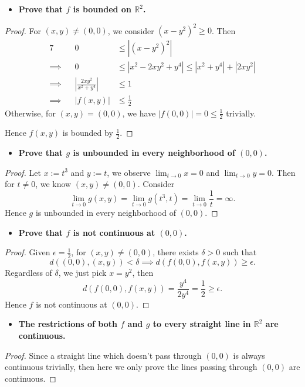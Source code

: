 \begin{Exercise}
	\begin{itemize}
		\item \textbf{Prove that $f$ is bounded on $\mathbb{R}^2$.}
	\end{itemize}
	\begin{proof}
		For $(x,y) \neq (0,0)$, we consider $(x-y^2)^2 \geq 0$. Then
		\begin{alignat*}{7}
		\quad&& 0 &\leq \left| (x-y^2)^2 \right| \\
		\implies&& 0 &\leq \left| x^2 - 2x y^2+ y^4 \right| \leq |x^2+y^4|+|2x y^2| \\
		\implies&& \left| \frac{2 x y^2}{x^2+y^4} \right| &\leq 1 \\
		\implies&& |f(x,y)| &\leq \frac{1}{2}
		\end{alignat*}
		Otherwise, for $(x,y)=(0,0)$, we have $|f(0,0)| = 0 \leq \frac{1}{2}$ trivially.
		
		Hence $f(x,y)$ is bounded by $\frac{1}{2}$.
	\end{proof}
	
	\begin{itemize}
		\item \textbf{Prove that $g$ is unbounded in every neighborhood of $(0,0)$.}
	\end{itemize}
	\begin{proof}
		Let $x := t^3$ and $y := t$, we observe $\lim_{t\to 0} x = 0$ and $\lim_{t\to 0} y = 0$. Then for $t\neq 0$, we know $(x,y) \neq (0,0)$. Consider
		$$
		\lim_{t\to 0} g(x,y) = \lim_{t\to 0} g(t^3,t) = \lim_{t\to 0}\frac{1}{t} = \infty.
		$$
		Hence $g$ is unbounded in every neighborhood of $(0,0)$.
	\end{proof}
	
	\begin{itemize}
		\item \textbf{Prove that $f$ is not continuous at $(0,0)$.}
	\end{itemize}
	\begin{proof}
		Given $\epsilon = \frac{1}{2}$, for $(x,y)\neq (0,0)$, there exists $\delta > 0$ such that
		$$
		d( (0,0),(x,y) ) <\delta \implies d(f(0,0),f(x,y))\geq \epsilon.
		$$
		Regardless of $\delta$, we just pick $x=y^2$, then
		$$
		d(f(0,0),f(x,y)) = \frac{y^4}{2y^4} = \frac{1}{2} \geq \epsilon.
		$$
		Hence $f$ is not continuous at $(0,0)$.
	\end{proof}
	
	\begin{itemize}
		\item \textbf{The restrictions of both $f$ and $g$ to every straight line in $\mathbb{R}^2$ are continuous.} 
	\end{itemize}
	\begin{proof}
		Since a straight line which doesn't pass through $(0,0)$ is always continuous trivially, then here we only prove the lines passing through $(0,0)$ are continuous.
		

\end{proof}
\end{Exercise}

